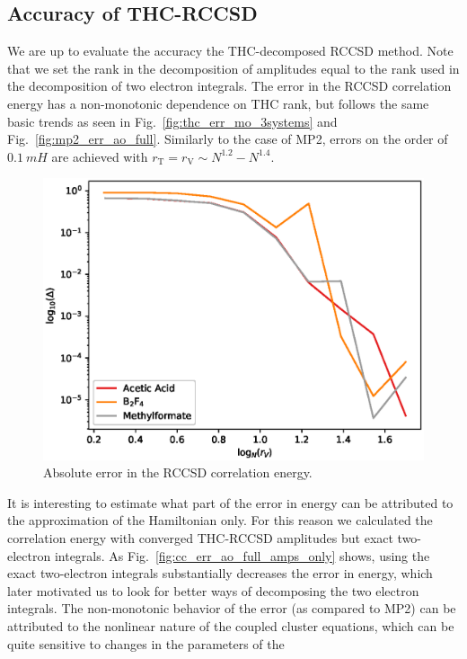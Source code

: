 \subsection{Accuracy of THC-RCCSD}
We are up to evaluate the accuracy the THC-decomposed RCCSD
method. Note that we set the rank in the decomposition of amplitudes 
equal to the rank used in the decomposition of two electron integrals. The 
error in the RCCSD correlation energy has a non-monotonic dependence on THC 
rank, but follows the 
same basic trends as seen in Fig.~\ref{fig:thc_err_mo_3systems} and
Fig.~\ref{fig:mp2_err_ao_full}. Similarly to the case of MP2, errors on 
the order of $0.1~mH$ are achieved with $r_\mathrm{T} = r_\mathrm{V} \sim 
N^{1.2} - N^{1.4}$.
%
\begin{figure}[tb]
\includegraphics[width=\columnwidth]{figures/thc_rccsd/cc_err_ao_full}
\caption{Absolute error in the RCCSD correlation energy.
\label{fig:cc_err_ao_full}}
\end{figure}
%
It is interesting to estimate what part of the error in energy can be
attributed to the approximation of the Hamiltonian only. For this reason we 
calculated the correlation energy with converged THC-RCCSD amplitudes but exact
two-electron integrals.  As Fig.~\ref{fig:cc_err_ao_full_amps_only}
shows, using the exact two-electron integrals substantially decreases the error 
in energy, which later motivated us to look for better ways of decomposing the 
two electron integrals. The non-monotonic behavior of the error (as compared to 
MP2) can be attributed to the nonlinear nature of the coupled cluster 
equations, which can be quite sensitive to changes in the parameters of the 
